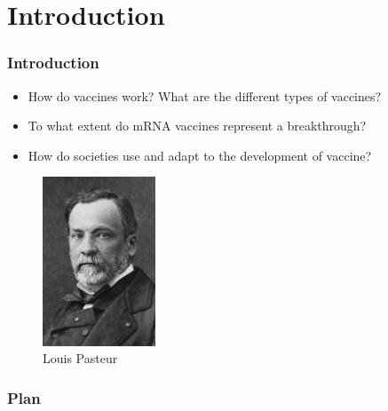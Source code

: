 \section*{Introduction}


\begin{frame}
    \frametitle{Introduction}
    \begin{itemize}
        \item How do vaccines work? What are the different types of vaccines?
        \item To what extent do mRNA vaccines represent a breakthrough?
        \item How do societies use and adapt to the development of vaccine?
    \end{itemize}

    \begin{figure}
        \centering
        \includegraphics[width=0.3\textwidth]{imgs/paster.jpg}
        \caption{Louis Pasteur}
        \label{fig:responses4}
    \end{figure}

\end{frame}

\begin{frame}
    \frametitle{Plan} %
    \tableofcontents %
\end{frame}


